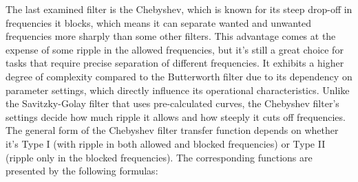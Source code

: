 The last examined filter is the Chebyshev, which is known for its steep drop-off in frequencies it blocks, which means it can separate wanted and unwanted frequencies more sharply than some other filters.
This advantage comes at the expense of some ripple in the allowed frequencies, but it's still a great choice for tasks that require precise separation of different frequencies.
It exhibits a higher degree of complexity compared to the Butterworth filter due to its dependency on parameter settings, which directly influence its operational characteristics.
Unlike the Savitzky-Golay filter that uses pre-calculated curves, the Chebyshev filter's settings decide how much ripple it allows and how steeply it cuts off frequencies.
The general form of the Chebyshev filter transfer function depends on whether it's Type I (with ripple in both allowed and blocked frequencies) or Type II (ripple only in the blocked frequencies).
The corresponding functions are presented by the following formulas:

